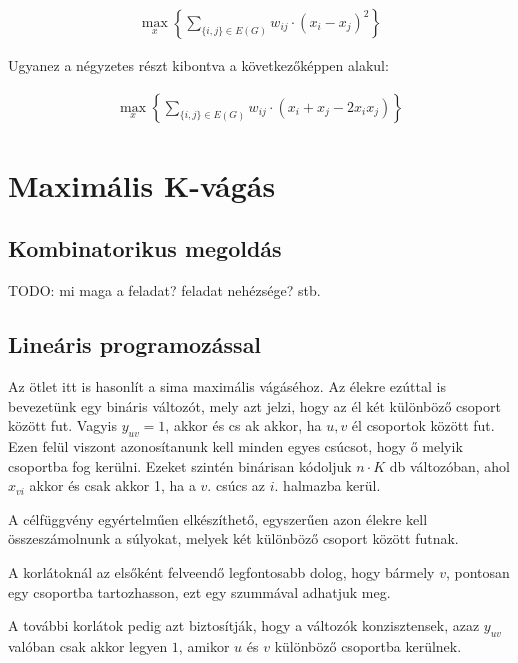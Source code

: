 \begin{align}
	\max_{x} \left\{ \sum_{\{i,j\} \in E(G)}{w_{ij} \cdot (x_i-x_j)^2}\right\}
\end{align}

Ugyanez a négyzetes részt kibontva a következőképpen alakul:

\begin{align}
	\max_{x} \left\{ \sum_{\{i,j\} \in E(G)}{w_{ij} \cdot (x_i+x_j-2 x_i x_j)}\right\}
\end{align}


\section{Maximális K-vágás}
\subsection{Kombinatorikus megoldás}
TODO: mi maga a feladat? feladat nehézsége? stb.

\subsection{Lineáris programozással}

Az ötlet itt is hasonlít a sima maximális vágáséhoz. Az élekre ezúttal is bevezetünk egy bináris változót, mely azt jelzi, hogy az él két különböző csoport között fut. Vagyis $y_{uv}=1$, akkor és cs
ak akkor, ha $u, v$ él csoportok között fut. Ezen felül viszont azonosítanunk kell minden egyes csúcsot, hogy ő melyik csoportba fog kerülni. Ezeket szintén binárisan kódoljuk $n \cdot K$ db változóban, ahol $x_{vi}$ akkor és csak akkor 1, ha a $v.$ csúcs az $i.$ halmazba kerül. 

A célfüggvény egyértelműen elkészíthető, egyszerűen azon élekre kell összeszámolnunk a súlyokat, melyek két különböző csoport között futnak.

A korlátoknál az elsőként felveendő legfontosabb dolog, hogy bármely $v$, pontosan egy csoportba tartozhasson, ezt egy szummával adhatjuk meg.

A további korlátok pedig azt biztosítják, hogy a változók konzisztensek, azaz  $y_{uv}$ valóban csak akkor legyen $1$, amikor  $u$ és $v$ különböző csoportba kerülnek.

